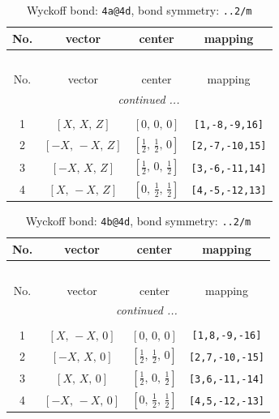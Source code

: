 \documentclass[fleqn,8pt]{jsarticle}
\begin{document}
\begin{longtable}{cccc}
\caption{Wyckoff bond: {\tt 4a@4d}, bond symmetry: {\tt ..2/m}}
 \\
 \hline \hline
No. & vector & center & mapping \\ \hline \endfirsthead

\multicolumn{3}{l}{\tablename\ \thetable{}} \\
 \hline \hline
No. & vector & center & mapping \\ \hline \endhead

 \hline \hline
\multicolumn{3}{r}{\footnotesize\it continued ...} \\ \endfoot

 \hline \hline
\multicolumn{3}{r}{} \\ \endlastfoot

1 & $\left[ X,\, X,\, Z \right]$ & $\left[ 0,\, 0,\, 0 \right]$ & {\tt [1,-8,-9,16]} \\ \hline
2 & $\left[ - X,\, - X,\, Z \right]$ & $\left[ \frac{1}{2},\, \frac{1}{2},\, 0 \right]$ & {\tt [2,-7,-10,15]} \\ \hline
3 & $\left[ - X,\, X,\, Z \right]$ & $\left[ \frac{1}{2},\, 0,\, \frac{1}{2} \right]$ & {\tt [3,-6,-11,14]} \\ \hline
4 & $\left[ X,\, - X,\, Z \right]$ & $\left[ 0,\, \frac{1}{2},\, \frac{1}{2} \right]$ & {\tt [4,-5,-12,13]} \\
\end{longtable}
\renewcommand{\arraystretch}{1.2}
\begin{longtable}{cccc}
\caption{Wyckoff bond: {\tt 4b@4d}, bond symmetry: {\tt ..2/m}}
 \\
 \hline \hline
No. & vector & center & mapping \\ \hline \endfirsthead

\multicolumn{3}{l}{\tablename\ \thetable{}} \\
 \hline \hline
No. & vector & center & mapping \\ \hline \endhead

 \hline \hline
\multicolumn{3}{r}{\footnotesize\it continued ...} \\ \endfoot

 \hline \hline
\multicolumn{3}{r}{} \\ \endlastfoot

1 & $\left[ X,\, - X,\, 0 \right]$ & $\left[ 0,\, 0,\, 0 \right]$ & {\tt [1,8,-9,-16]} \\ \hline
2 & $\left[ - X,\, X,\, 0 \right]$ & $\left[ \frac{1}{2},\, \frac{1}{2},\, 0 \right]$ & {\tt [2,7,-10,-15]} \\ \hline
3 & $\left[ X,\, X,\, 0 \right]$ & $\left[ \frac{1}{2},\, 0,\, \frac{1}{2} \right]$ & {\tt [3,6,-11,-14]} \\ \hline
4 & $\left[ - X,\, - X,\, 0 \right]$ & $\left[ 0,\, \frac{1}{2},\, \frac{1}{2} \right]$ & {\tt [4,5,-12,-13]} \\
\end{longtable}
\end{document}
